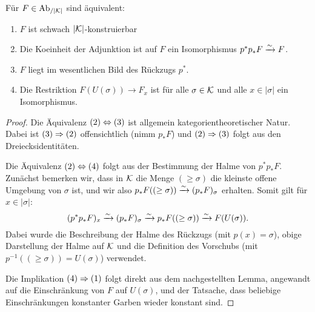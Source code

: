 \begin{prop}[\cite{WS}]
  Für $F \in \operatorname{Ab}_{/|\mathcal{K}|}$ sind äquivalent:
  \begin{enumerate}
  \item $F$ ist schwach $|\mathcal{K}|$-konstruierbar
  \item Die Koeinheit der Adjunktion ist auf $F$ ein Isomorphismus
    $p^*p_*F \xrightarrow{\sim} F$.
  \item $F$ liegt im wesentlichen Bild des Rückzugs $p^*$.
  \item Die Restriktion $F(U(\sigma)) \to F_x$ ist für alle $\sigma
    \in \mathcal{K}$ und alle $x \in |\sigma|$ ein Isomorphismus.
  \end{enumerate}
\end{prop}
\begin{proof}
  Die Äquivalenz $(2) \Leftrightarrow (3)$ ist allgemein kategorientheoretischer
  Natur. Dabei ist $(3) \Rightarrow (2)$ offensichtlich (nimm $p_* F$)
  und $(2) \Rightarrow (3)$ folgt aus den Dreiecksidentitäten.

  Die Äquivalenz $(2) \Leftrightarrow (4)$ folgt aus der Bestimmung der Halme von
  $p^*p_* F$. Zunächst bemerken wir, dass in $\mathcal{K}$ die Menge $(\geq
  \sigma)$ die kleinste offene Umgebung von $\sigma$ ist, und wir also
  $p_*F((\geq \sigma)) \xrightarrow{\sim} (p_*F)_{\sigma}$ erhalten. Somit gilt für
  $x \in |\sigma|$:
  \[ (p^*p_*F)_x \xrightarrow{\sim} (p_*F)_{\sigma} \xrightarrow{\sim} p_*F((\geq \sigma)) \xrightarrow{\sim} F(U(\sigma)). \]
  Dabei wurde die Beschreibung der Halme des Rückzugs (mit $p(x) =
  \sigma$), obige Darstellung der Halme auf $\mathcal{K}$ und die Definition
  des Vorschubs (mit $p^{-1}((\geq \sigma)) = U(\sigma)$) verwendet.

  Die Implikation $(4) \Rightarrow (1)$ folgt direkt aus dem
  nachgestellten Lemma, angewandt auf die Einschränkung von $F$ auf
  $U(\sigma)$, und der Tatsache, dass beliebige Einschränkungen
  konstanter Garben wieder konstant sind.

  

\end{proof}
